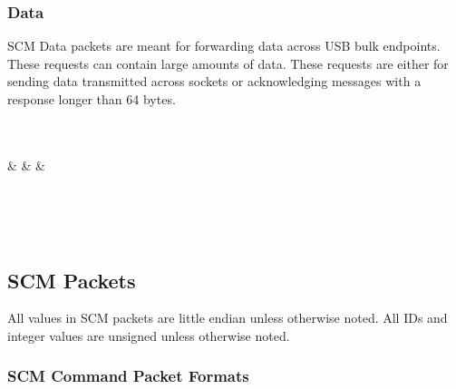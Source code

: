 \documentclass[10pt]{article}
\begin{document}
	\subsubsection{Data}
	SCM Data packets are meant for forwarding data across USB bulk endpoints. These requests can contain large amounts of data. These requests are either for sending data transmitted across sockets or acknowledging messages with a response longer than 64 bytes.\\
	\\
	\begin{bytefield}[bitwidth=1.7em]{32}
		 \\
		 &
		 &
		 &
		 \\
		 \\
		 \\
	\end{bytefield}\\
	\subsection{SCM Packets} \mbox{}
	All values in SCM packets are little endian unless otherwise noted. All IDs and integer values are unsigned unless otherwise noted.
	\subsubsection{SCM Command Packet Formats}
	\setcounter{secnumdepth}{5}
\end{document}
